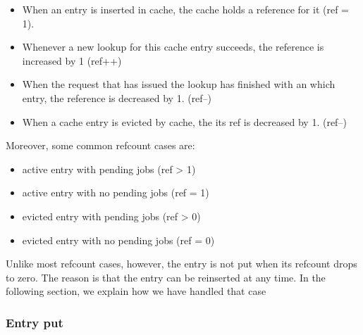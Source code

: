 \begin{itemize}
	\item When an entry is inserted in cache, the cache holds a reference 
		for it (ref = 1).
	\item Whenever a new lookup for this cache entry succeeds, the reference 
		is increased by 1 (ref++)
	\item When the request that has issued the lookup has finished with an 
		which entry, the reference is decreased by 1. (ref--)
	\item When a cache entry is evicted by cache, the its ref is decreased 
		by 1. (ref--)
\end{itemize}

Moreover, some common refcount cases are:

\begin{itemize}
	\item active entry with pending jobs (ref > 1)
	\item active entry with no pending jobs (ref = 1)
	\item evicted entry with pending jobs (ref > 0)
	\item evicted entry with no pending jobs (ref = 0)
\end{itemize}

\begin{comment}
\begin{table}
	\centering
	\begin{tabular}{ | l | l | }
		\hline
		Case & Refcount \\ \hline \hline
		active entry with pending jobs & ref > 1 \\ \hline
		active entry with no pending jobs & ref = 1 \\ \hline
		evicted entry with pending jobs & ref > 0 \\ \hline
		evicted entry with no pending jobs & ref = 0 \\ \hline
	\end{tabular}
	\caption{Reference counting of xcache}
	\label{tab:refcount}
\end{table}
\end{comment}

Unlike most refcount cases, however, the entry is not put when its refcount 
drops to zero. The reason is that the entry can be reinserted at any time. In 
the following section, we explain how we have handled that case

\subsubsection{Entry put}

